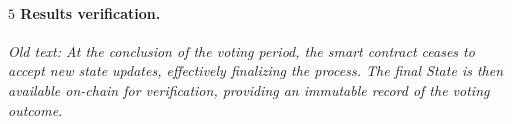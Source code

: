 \paragraph{$\boxed{5}$ Results verification.}


\textit{Old text: At the conclusion of the voting period, the smart contract ceases to accept new state updates, effectively finalizing the process. The final State is then available on-chain for verification, providing an immutable record of the voting outcome.}